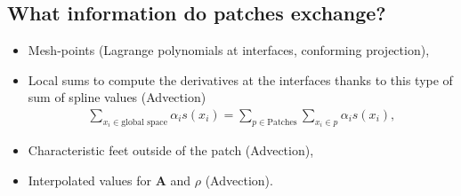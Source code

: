 \documentclass[presentation.tex]{subfiles}
\begin{document}
\subsection{What information do patches exchange?}
\begin{itemize}
    \item Mesh-points (Lagrange polynomials at interfaces, 
            conforming projection),
    \item Local sums to compute the derivatives at the interfaces thanks to this 
        type of sum of spline values (Advection)
            \begin{align*}
                \sum_{x_i \in \text{global space}} \alpha_i s(x_i) = \sum_{p \in\text{Patches}} 
                        \sum_{x_i \in p} \alpha_i s(x_i),
            \end{align*}
    \item Characteristic feet outside of the patch (Advection),
    \item Interpolated values for $\mathbf{A}$ and $\rho$ (Advection).
\end{itemize}
\end{document}
